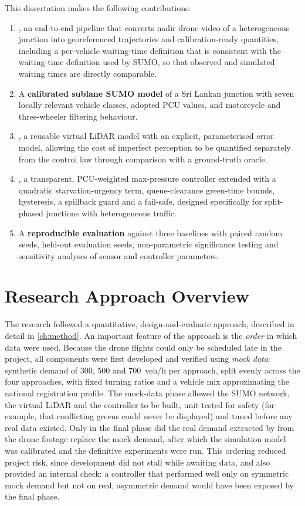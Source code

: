 This dissertation makes the following contributions:
\begin{enumerate}[itemsep=2pt]
  \item \textbf{\dtx{}}, an end-to-end pipeline that converts nadir drone video of a heterogeneous junction into georeferenced trajectories and calibration-ready quantities, including a per-vehicle waiting-time definition that is consistent with the waiting-time definition used by SUMO, so that observed and simulated waiting times are directly comparable.
  \item A \textbf{calibrated sublane SUMO model} of a Sri Lankan junction with seven locally relevant vehicle classes, adopted PCU values, and motorcycle and three-wheeler filtering behaviour.
  \item \textbf{\vls{}}, a reusable virtual LiDAR model with an explicit, parameterised error model, allowing the cost of imperfect perception to be quantified separately from the control law through comparison with a ground-truth oracle.
  \item \textbf{\prism{}}, a transparent, PCU-weighted max-pressure controller extended with a quadratic starvation-urgency term, queue-clearance green-time bounds, hysteresis, a spillback guard and a fail-safe, designed specifically for split-phased junctions with heterogeneous traffic.
  \item A \textbf{reproducible evaluation} against three baselines with paired random seeds, held-out evaluation seeds, non-parametric significance testing and sensitivity analyses of sensor and controller parameters.
\end{enumerate}

\section{Research Approach Overview}\label{sec:intro-approach}

The research followed a quantitative, design-and-evaluate approach, described in detail in \cref{ch:method}. An important feature of the approach is the \emph{order} in which data were used. Because the drone flights could only be scheduled late in the project, all components were first developed and verified using \emph{mock data}: synthetic demand of 300, 500 and 700~veh/h per approach, split evenly across the four approaches, with fixed turning ratios and a vehicle mix approximating the national registration profile. The mock-data phase allowed the SUMO network, the virtual LiDAR and the controller to be built, unit-tested for safety (for example, that conflicting greens could never be displayed) and tuned before any real data existed. Only in the final phase did the real demand extracted by \dtx{} from the drone footage replace the mock demand, after which the simulation model was calibrated and the definitive experiments were run. This ordering reduced project risk, since development did not stall while awaiting data, and also provided an internal check: a controller that performed well only on symmetric mock demand but not on real, asymmetric demand would have been exposed by the final phase.

